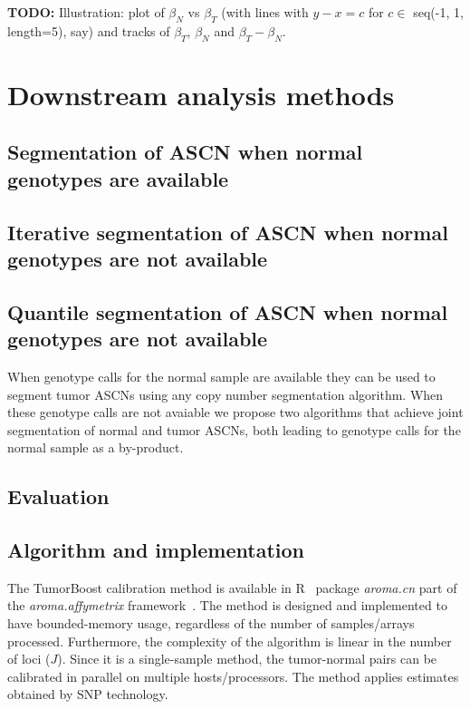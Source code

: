 \documentclass[draft]{bioinfo}
\newcommand{\pkg}[1]{\textit{#1}\xspace}
\newenvironment{TODO}{\color{red}\textbf{TODO:}}{}
\begin{document}
\begin{methods}
\begin{TODO}
  Illustration: plot of $\beta_N$ vs $\beta_T$ (with lines with $y-x=c$ for $c \in$ seq(-1, 1, length=5), say) and tracks of $\beta_T$, $\beta_N$ and $\beta_T-\beta_N$. 
\end{TODO}

\section{Downstream analysis methods}
\label{sec:downstr-analys-meth}

\subsection{Segmentation of ASCN when normal genotypes are available}
\label{sec:segm-ascn-with-genotypes}

\subsection{Iterative segmentation of ASCN when normal genotypes are not available}
\label{sec:iter-segm-ascn}

\subsection{Quantile segmentation of ASCN when normal genotypes are not available}
\label{sec:quant-segm-ascn}


 When genotype calls for the normal sample are available they can be used to segment tumor ASCNs using any copy number segmentation algorithm. When these genotype calls are not avaiable we propose two algorithms that achieve joint segmentation of normal and tumor ASCNs, both leading to genotype calls for the normal sample as a by-product. 

\subsection{Evaluation}
\label{secEvaluation}



\subsection{Algorithm and implementation}
The TumorBoost calibration method is available in R~\citep{RDevel_2008} package \pkg{aroma.cn} part of the \pkg{aroma.affymetrix} framework~\citep{BengtssonH_etal_2008b}.  The  method is designed and implemented to have bounded-memory usage, regardless of the number of samples/arrays processed. 
Furthermore, the complexity of the algorithm is linear in the number of loci ($J$).
Since it is a single-sample method, the tumor-normal pairs can be calibrated in parallel on multiple hosts/processors.
The method applies estimates obtained by SNP technology.
\end{methods}
\end{document}
